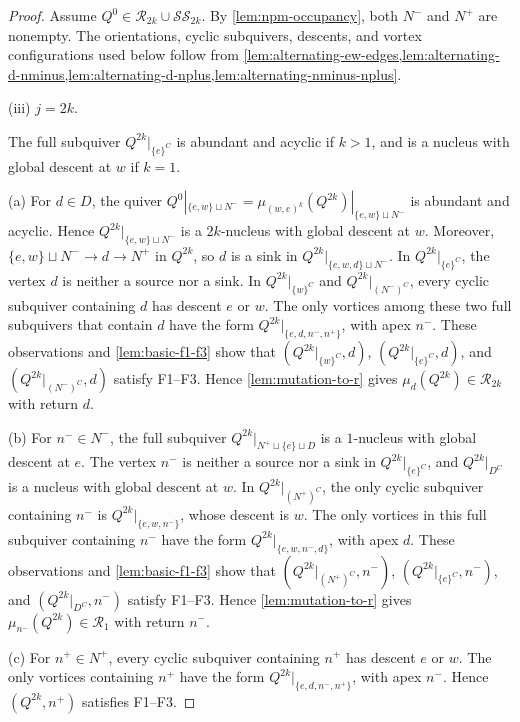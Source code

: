 \documentclass[10pt,a4paper]{amsart}
\theoremstyle{definition}
\theoremstyle{definition}
\numberwithin{equation}{section}
\numberwithin{table}{section}
\newcommand{\nminus}{N^{-}}
\newcommand{\nplus}{N^{+}}
\newcommand{\Rclass}{\mathcal{R}}
\newcommand{\SSclass}{\mathcal{SS}}
\newcommand{\Qalt}[1]{Q^{#1}}
\begin{document}
\begin{proof}
Assume $\Qalt{0}\in\Rclass_{2k}\cup\SSclass_{2k}$. By
\cref{lem:npm-occupancy}, both $\nminus$ and $\nplus$ are nonempty.
The orientations, cyclic subquivers, descents, and vortex configurations used
below follow from
\cref{lem:alternating-ew-edges,lem:alternating-d-nminus,lem:alternating-d-nplus,lem:alternating-nminus-nplus}.

\textup{(iii)} $j=2k$.

The full subquiver $\Qalt{2k}|_{\{e\}^C}$ is abundant and acyclic if $k>1$,
and is a nucleus with global descent at $w$ if $k=1$.

\textup{(a)} For $d\in D$, the quiver
$\Qalt{0}|_{\{e,w\}\sqcup\nminus}
=\mu_{(w,e)^k}(\Qalt{2k})|_{\{e,w\}\sqcup\nminus}$
is abundant and acyclic. Hence
$\Qalt{2k}|_{\{e,w\}\sqcup\nminus}$ is a $2k$-nucleus with global descent
at $w$. Moreover,
$\{e,w\}\sqcup\nminus\to d\to\nplus$ in $\Qalt{2k}$, so $d$ is a sink in
$\Qalt{2k}|_{\{e,w,d\}\sqcup\nminus}$. In $\Qalt{2k}|_{\{e\}^C}$,
the vertex $d$ is neither a source nor a sink. In
$\Qalt{2k}|_{\{w\}^C}$ and $\Qalt{2k}|_{(\nminus)^C}$, every cyclic
subquiver containing $d$ has descent $e$ or $w$. The only vortices among these
two full subquivers that contain $d$ have the form
$\Qalt{2k}|_{\{e,d,n^-,n^+\}}$, with apex $n^-$. These observations and \cref{lem:basic-f1-f3} show that
$(\Qalt{2k}|_{\{w\}^C},d)$, $(\Qalt{2k}|_{\{e\}^C},d)$, and
$(\Qalt{2k}|_{(\nminus)^C},d)$ satisfy F1--F3. Hence
\cref{lem:mutation-to-r} gives
$\mu_d(\Qalt{2k})\in\Rclass_{2k}$ with return $d$.

\textup{(b)} For $n^-\in\nminus$, the full subquiver
$\Qalt{2k}|_{\nplus\sqcup\{e\}\sqcup D}$ is a $1$-nucleus with global descent
at $e$. The vertex $n^-$ is neither a source nor a sink in
$\Qalt{2k}|_{\{e\}^C}$, and $\Qalt{2k}|_{D^C}$ is a nucleus
with global descent at $w$. In $\Qalt{2k}|_{(\nplus)^C}$, the only cyclic
subquiver containing $n^-$ is $\Qalt{2k}|_{\{e,w,n^-\}}$, whose descent is
$w$. The only vortices in this full subquiver containing $n^-$ have the form
$\Qalt{2k}|_{\{e,w,n^-,d\}}$, with apex $d$. These observations and \cref{lem:basic-f1-f3} show that
$(\Qalt{2k}|_{(\nplus)^C},n^-)$, $(\Qalt{2k}|_{\{e\}^C},n^-)$, and
$(\Qalt{2k}|_{D^C},n^-)$ satisfy F1--F3. Hence
\cref{lem:mutation-to-r} gives
$\mu_{n^-}(\Qalt{2k})\in\Rclass_1$ with return $n^-$.

\textup{(c)} For $n^+\in\nplus$, every cyclic subquiver containing
$n^+$ has descent $e$ or $w$. The only
vortices containing $n^+$ have the
form $\Qalt{2k}|_{\{e,d,n^-,n^+\}}$, with apex $n^-$. Hence
$(\Qalt{2k},n^+)$ satisfies F1--F3.


\end{proof}
\end{document}
